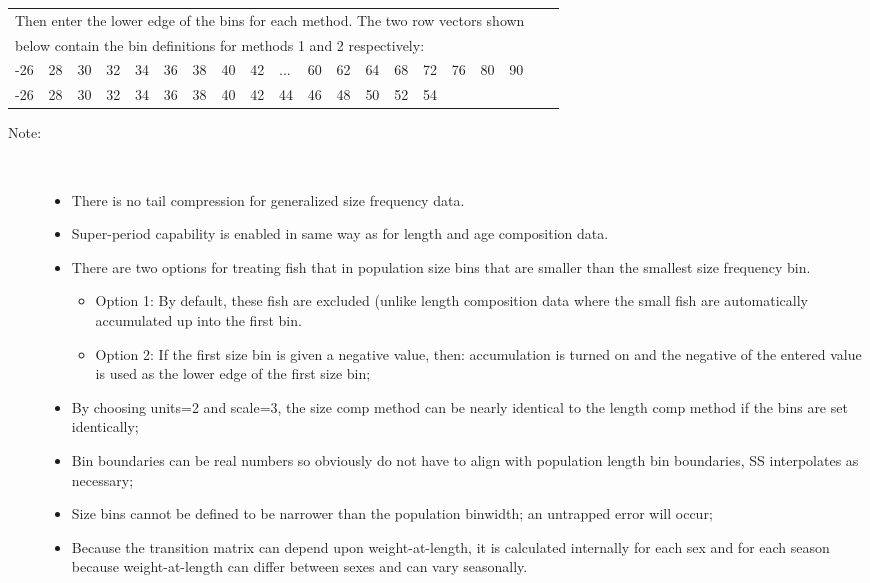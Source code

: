 \begin{center}
	\begin{tabular}{p{0.4cm} p{0.4cm} p{0.4cm} p{0.4cm} p{0.4cm} p{0.4cm} p{0.5cm} p{0.5cm} p{0.5cm} p{0.5cm} p{0.5cm} p{0.5cm} p{0.5cm} p{0.5cm} p{0.5cm} p{0.5cm} p{0.5cm} p{0.5cm} p{0.5cm} p{0.25cm}}
		\multicolumn{18}{l}{Then enter the lower edge of the bins for each method. The two row vectors shown}\\
		\multicolumn{18}{l}{below contain the bin definitions for methods 1 and 2 respectively:}\\
		\hline
		-26 & 28 & 30 & 32 & 34 & 36 & 38 & 40 & 42 & ... & 60 & 62 & 64 & 68 & 72 & 76 & 80 & 90\\
		-26 & 28 & 30 & 32 & 34 & 36 & 38 & 40 & 42 &  44 & 46 & 48 & 50 & 52 & \multicolumn{4}{l}{54} \\
		\hline 
	\end{tabular}
\end{center}

\begin{description}
	\item[Note:]\
	\begin{itemize}
		\item There is no tail compression for generalized size frequency data.
		\item Super-period capability is enabled in same way as for length and age composition data.
		\item There are two options for treating fish that in population size bins that are smaller than the smallest size frequency bin.
		\begin{itemize}
			\item Option 1:  By default, these fish are excluded (unlike length composition data where the small fish are automatically accumulated up into the first bin.
			\item Option 2:  If the first size bin is given a negative value, then:  accumulation is turned on and the negative of the entered value is used as the lower edge of the first size bin;
		\end{itemize}
		\item By choosing units=2 and scale=3, the size comp method can be nearly identical to the length comp method if the bins are set identically;
		\item Bin boundaries can be real numbers so obviously do not have to align with population length bin boundaries, SS interpolates as necessary;
		\item Size bins cannot be defined to be narrower than the population binwidth; an untrapped error will occur;
		\item Because the transition matrix can depend upon weight-at-length, it is calculated internally for each sex and for each season because weight-at-length can differ between sexes and can vary seasonally.
	\end{itemize}
\end{description}

